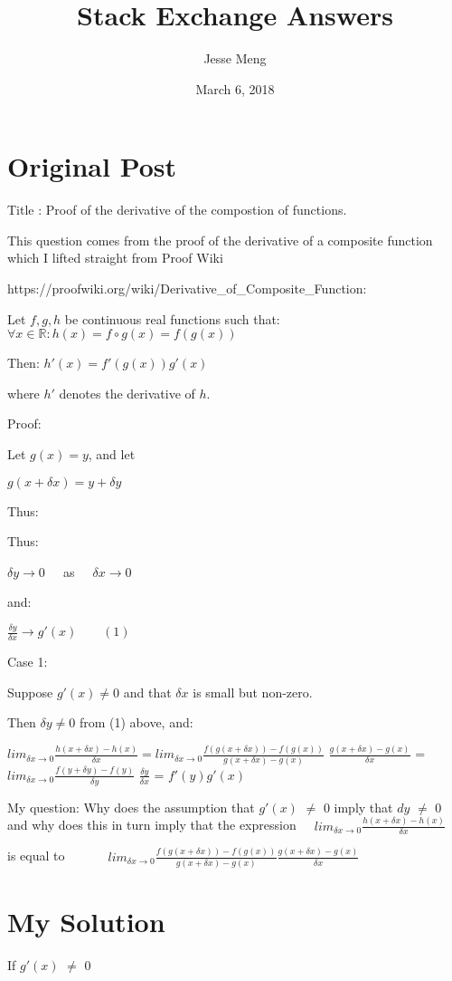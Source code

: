 \documentclass{article}
\title{Stack Exchange Answers}
\author{Jesse Meng }
\date{March 6, 2018}
\begin{document}
\maketitle

\section{Original Post}
Title : Proof of the derivative of the compostion of functions.

This question comes from the proof of the derivative of a composite function which I lifted straight from Proof Wiki 

https://proofwiki.org/wiki/Derivative_of_Composite_Function:

Let $f, g, h$ be continuous real functions such that: $\forall x \in \mathbb R: h \left({x}\right) = f \circ g \left({x}\right) = f \left({g \left({x}\right)}\right)$ 

Then: $h' \left({x}\right) = f' \left({g \left({x}\right)}\right) g' \left({x}\right)$ 

where $h'$ denotes the derivative of $h$.

Proof:

Let $g \left({x}\right) = y$, and let

$g(x+δx) 	=	y+δy$

Thus: 

Thus:

$δy→0\ \ \ \ \ $   as    $\  \ \ \ \ δx→0$

and:

$\frac{δy}{δx}→g′(x) \ \ \ \ \ \ \ \ \ (1)$

Case 1:

Suppose $g′(x)≠0$ and that $δx$ is small but non-zero.

Then $δy≠0$ from (1) above, and:

$lim_{δx→0} \frac{h(x+δx)−h(x)}{δx}	=				lim_{δx→0}\frac{f(g(x+δx))−f(g(x))}{g(x+δx)−g(x)}$ $\frac{g(x+δx)−g(x)}{δx}$				
=				$lim_{δx→0}\frac{f(y+δy)−f(y)}{δy}$ $\frac{δy}{δx}$				
=				$f′(y)g′(x)$

My question: Why does the assumption that $g'(x)$ $\neq$ $0$ imply that $dy$ $\neq$ $0$ and why does this in turn imply that the expression $\ \ \ \ \ lim_{δx→0} \frac{h(x+δx)−h(x)}{δx}\ \ \ \ \ $      

is equal to $\ \ \ \ \ \ \ \ \ \ \ \ \ \ lim_{δx→0}\frac{f(g(x+δx))−f(g(x))}{g(x+δx)−g(x)}\frac{g(x+δx)−g(x)}{δx}$		
\section{My Solution}
If $g'(x)$ $\neq$ $0$ 
\end{document}
